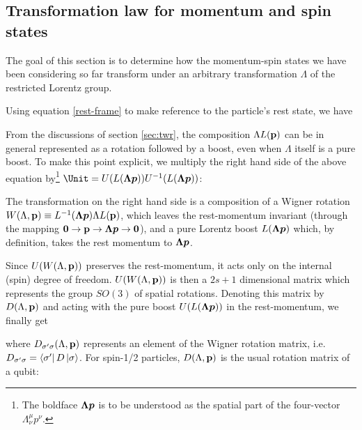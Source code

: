 \documentclass[12pt,a4paper,notitlepage]{report}
\begin{document}
\subsection{Transformation law for momentum and spin states}

The goal of this section is to determine how the momentum-spin states we have been considering so far transform under an arbitrary transformation $\Lambda$ of the restricted Lorentz group.

Using equation \eqref{rest-frame} to make reference to the particle's rest state, we have

%
From the discussions of section \ref{sec:twr}, the composition $\Lambda L(\vb{p})$ can be in general represented as a rotation followed by a boost, even when $\Lambda$ itself is a pure boost. To make this point explicit, we multiply the right hand side of the above equation by\footnote{The boldface $\vb*{\Lambda p}$ is to be understood as the spatial part of the four-vector $\Lambda^\mu_\nu p^\nu$.} $\Unit = U(L(\vb*{\Lambda p}))U^{-1}(L(\vb*{\Lambda p}))$:

%
The transformation on the right hand side is a composition of a Wigner rotation $W(\Lambda, \vb{p}) \equiv L^{-1}(\vb*{\Lambda p})\Lambda L(\vb{p})$, which leaves the rest-momentum invariant (through the mapping $\vb{0} \rightarrow \vb{p} \rightarrow \vb*{\Lambda p} \rightarrow \vb{0}$), and a pure Lorentz boost $L(\vb*{\Lambda p})$ which, by definition, takes the rest momentum to $\vb*{\Lambda p}$. 

Since $U(W(\Lambda, \vb{p}))$ preserves the rest-momentum, it acts only on the internal (spin) degree of freedom. $U(W(\Lambda, \vb{p}))$ is then a $2s+1$ dimensional matrix which represents the group $SO(3)$ of spatial rotations. Denoting this matrix by $D(\Lambda, \vb{p})$ and acting with the pure boost $U(L(\vb*{\Lambda p}))$ in the rest-momentum, we finally get

%
where $D_{\sigma'\sigma}(\Lambda, \vb{p})$ represents an element of the Wigner rotation matrix, i.e. $D_{\sigma'\sigma}=\bra{\sigma'}D\ket{\sigma}$.
For spin-1/2 particles, $D(\Lambda, \vb{p})$ is the usual rotation matrix of a qubit:
\end{document}
